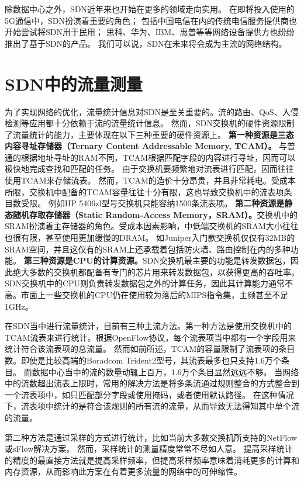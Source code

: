 除数据中心之外，SDN近年来也开始在更多的领域走向实用。
在即将投入使用的5G通信中，SDN扮演着重要的角色\cite{zhang2017network}；
包括中国电信在内的传统电信服务提供商也开始尝试将SDN用于民用；
思科、华为、IBM、惠普等等网络设备提供方也纷纷推出了基于SDN的产品。
我们可以说，SDN在未来将会成为主流的网络结构。

\section{SDN中的流量测量}\label{sec:measurement}
为了实现网络的优化，流量统计信息对SDN是至关重要的。流的路由、QoS、入侵检测等应用都十分依赖于流的流量统计信息。
然而，SDN交换机的硬件资源限制了流量统计的能力，主要体现在以下三种重要的硬件资源上。
\textbf{第一种资源是三态内容寻址存储器（Ternary Content Addressable Memory, TCAM）。}
与普通的根据地址寻址的RAM不同，TCAM根据匹配字段的内容进行寻址，因而可以极快地完成查找和匹配的任务。
由于交换机要频繁地对流表进行匹配，因而往往使用TCAM来存储流表。
然而，TCAM的造价十分昂贵，并且非常耗电。受成本所限，交换机中配备的TCAM容量往往十分有限，这也导致交换机中的流表项条目数受限。
例如HP 5406zl型号交换机只能容纳1500条流表项\cite{curtis2011devoflow}。
\textbf{第二种资源是静态随机存取存储器（Static Random-Access Memory，SRAM）。}交换机中的SRAM扮演着主存储器的角色。受成本因素影响，中低端交换机的SRAM大小往往也很有限，甚至使用更加缓慢的DRAM。
如Juniper入门款交换机仅仅有32MB的SRAM空间\cite{ResourceMonitoring}，并且这仅有的SRAM上还承载着包括防火墙、路由控制在内的多种功能。
\textbf{第三种资源是CPU的计算资源。}SDN交换机最主要的功能是转发数据包，因此绝大多数的交换机都配备有专门的芯片用来转发数据包，以获得更高的吞吐率。
SDN交换机中的CPU则负责转发数据包之外的计算任务，因此其计算能力通常不高。市面上一些交换机的CPU仍在使用较为落后的MIPS指令集，主频甚至不足1GHz\cite{wang2014scotch}。

在SDN当中进行流量统计，目前有三种主流方法。第一种方法是使用交换机中的TCAM流表来进行统计。根据OpenFlow协议\cite{pfaff2012openflow}，每个流表项当中都有一个字段用来统计符合该流表项的总流量。
然而如前所述，TCAM的容量限制了流表项的条目数。即使是比较高端的Boradcom Trident2型号，其流表最多也只支持1.6万个条目\cite{cohen2014effect}。
而数据中心当中的流的数量动辄上百万\cite{kandula2009nature}，1.6万个条目显然远远不够。
当网络中的流数超出流表上限时，常用的解决方法是将多条流通过规则整合的方式整合到一个流表项中\cite{zhao2018joint}，如只匹配部分字段或使用掩码，或者使用默认路径。
在这种情况下，流表项中统计的是符合该规则的所有流的流量，从而导致无法得知其中单个流的流量。

第二种方法是通过采样的方式进行统计，比如当前大多数交换机所支持的NetFlow\cite{estan2004building}或sFlow\cite{phaal2004sflow}解决方案。
然而，采样统计的测量精度常常不尽如人意\cite{yu2013software}\cite{li2016flowradar}。
提高采样统计的精度的最直接方法就是提高采样频率，但提高采样频率意味着消耗更多的计算和内存资源，从而影响此方案在有着更多流量的网络中的可伸缩性。

